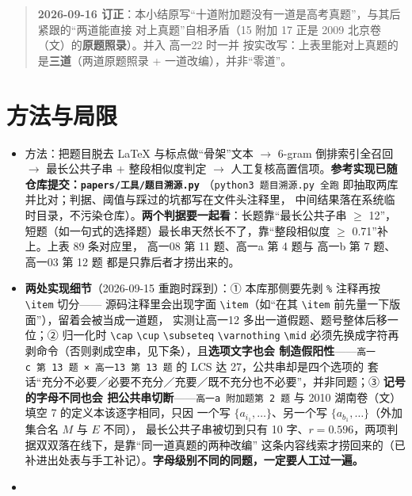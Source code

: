 \documentclass[a4paper,11pt]{article}
\providecommand{\tightlist}{%
  \setlength{\itemsep}{0pt}\setlength{\parskip}{0pt}}
\begin{document}
\begin{quote}
\textbf{2026-09-16 订正}：本小结原写``十道附加题没有一道是高考真题''，与其后紧跟的``两道能直接
对上真题''自相矛盾（15 附加 17 正是 2009 北京卷（文）的\textbf{原题照录}）。并入 高一22 时一并
按实改写：上表里能对上真题的是\textbf{三道}（两道原题照录 + 一道改编），并非``零道''。
\end{quote}

\clearpage
\section{方法与局限}

\begin{itemize}
\tightlist
\item
  方法：把题目脱去 LaTeX 与标点做``骨架''文本 $\to$ 6-gram 倒排索引全召回 $\to$ 最长公共子串 +
  整段相似度判定 $\to$ 人工复核高置信项。\textbf{参考实现已随仓库提交：\texttt{papers/\allowbreak{}工具/\allowbreak{}题目溯源.py}}
  （\texttt{python3\ 题目溯源.py\ 全跑} 即抽取两库并比对；判据、阈值与踩过的坑都写在文件头注释里，
  中间结果落在系统临时目录，不污染仓库）。\textbf{两个判据要一起看}：长题靠``最长公共子串 $\geqslant$ 12''，
  短题（如一句式的选择题）最长串天然长不了，靠``整段相似度 $\geqslant$ 0.71''补上。上表 89 条对应里，
  高一08 第 11 题、高一a 第 4 题与 高一b 第 7 题、高一03 第 12 题 都是只靠后者才捞出来的。
\item
  \textbf{两处实现细节}（2026-09-15 重跑时踩到）：① 本库那侧要先剥 \texttt{\%} 注释再按 \texttt{\textbackslash{}item} 切分------
  源码注释里会出现字面 \texttt{\textbackslash{}item}（如``在其 \texttt{\textbackslash{}item} 前先量一下版面''），留着会被当成一道题，
  实测让高一12 多出一道假题、题号整体后移一位；② 归一化时 \texttt{\textbackslash{}cap} \texttt{\textbackslash{}cup} \texttt{\textbackslash{}subseteq}
  \texttt{\textbackslash{}varnothing} \texttt{\textbackslash{}mid} 必须先换成字符再剥命令（否则剥成空串，见下条），且\textbf{选项文字也会
  制造假阳性}------\texttt{高一c\ 第\ 13\ 题\ ×\ 高一13\ 第\ 13\ 题} 的 LCS 达 27，公共串却是四个选项的
  套话``充分不必要／必要不充分／充要／既不充分也不必要''，并非同题；③ \textbf{记号的字母不同也会
  把公共串切断}------\texttt{高一a\ 附加题第\ 2\ 题} 与 2010 湖南卷（文）填空 7 的定义本该逐字相同，只因
  一个写 \(\{a_{i_1},\dots\}\)、另一个写 \(\{a_{b_1},\dots\}\)（外加集合名 \(M\) 与 \(E\) 不同），
  最长公共子串被切到只有 10 字、\(r=0.596\)，两项判据双双落在线下，是靠``同一道真题的两种改编''
  这条内容线索才捞回来的（已补进出处表与手工补记）。\textbf{字母级别不同的同题，一定要人工过一遍。}
\item

\end{itemize}
\end{document}

